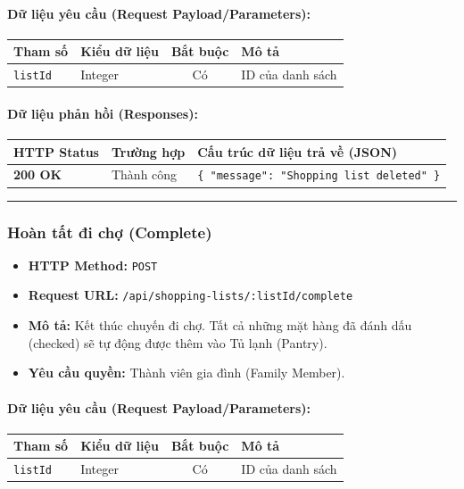 \documentclass[12pt,a4paper]{article}
\begin{document}
\paragraph{Dữ liệu yêu cầu (Request Payload/Parameters):}
\begin{longtable}{|>{\raggedright\arraybackslash}p{2.8cm}|>{\raggedright\arraybackslash}p{2.2cm}|c|>{\raggedright\arraybackslash}p{7.0cm}|}
\hline
\textbf{Tham số} & \textbf{Kiểu dữ liệu} & \textbf{Bắt buộc} & \textbf{Mô tả} \\ \hline
\endhead
\texttt{listId} & Integer & Có & ID của danh sách \\ \hline
\end{longtable}

\paragraph{Dữ liệu phản hồi (Responses):}
\begin{longtable}{|>{\raggedright\arraybackslash}p{2.8cm}|>{\raggedright\arraybackslash}p{3.2cm}|>{\raggedright\arraybackslash}p{8.0cm}|}
\hline
\textbf{HTTP Status} & \textbf{Trường hợp} & \textbf{Cấu trúc dữ liệu trả về (JSON)} \\ \hline
\endhead
\textbf{200 OK} & Thành công & \texttt{\{ "message": "Shopping list deleted" \}} \\ \hline
\end{longtable}

\vskip 0.4cm
\noindent\rule{\textwidth}{0.3pt}
\vskip 0.4cm

\subsubsection{Hoàn tất đi chợ (Complete)}
\begin{itemize}[leftmargin=*]
    \item \textbf{HTTP Method:} \texttt{POST}
    \item \textbf{Request URL:} \texttt{/api/shopping-lists/:listId/complete}
    \item \textbf{Mô tả:} Kết thúc chuyến đi chợ. Tất cả những mặt hàng đã đánh dấu (checked) sẽ tự động được thêm vào Tủ lạnh (Pantry).
    \item \textbf{Yêu cầu quyền:} Thành viên gia đình (Family Member).
\end{itemize}

\paragraph{Dữ liệu yêu cầu (Request Payload/Parameters):}
\begin{longtable}{|>{\raggedright\arraybackslash}p{2.8cm}|>{\raggedright\arraybackslash}p{2.2cm}|c|>{\raggedright\arraybackslash}p{7.0cm}|}
\hline
\textbf{Tham số} & \textbf{Kiểu dữ liệu} & \textbf{Bắt buộc} & \textbf{Mô tả} \\ \hline
\endhead
\texttt{listId} & Integer & Có & ID của danh sách \\ \hline
\end{longtable}
\end{document}
